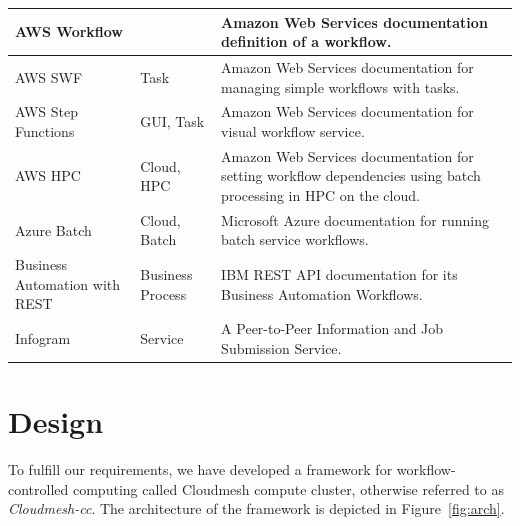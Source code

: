\documentclass[sigplan,screen]{acmart}
\newcommand{\FILE}[1]{}
\begin{document}
\begin{table}[htb]
{{\begin{tabular}{|p{3cm}|p{3cm}|p{10cm}|}
AWS Workflow \cite{www-aws-workflow} &  & Amazon Web Services documentation definition of a workflow.\\
\hline

AWS SWF \cite{www-aws-swf} & Task & Amazon Web Services documentation for managing simple workflows with tasks. \\
\hline

AWS Step Functions \cite{www-aws-stepfunctions} & GUI, Task & Amazon Web Services documentation for visual workflow service. \\
\hline

AWS HPC  \cite{www-aws-batch-workflow} & Cloud, HPC & Amazon Web Services documentation for setting workflow dependencies using batch processing in HPC on the cloud. \\
\hline

Azure Batch \cite{www-azure-batch} & Cloud, Batch & Microsoft Azure documentation for running batch service workflows. \\
  \hline

 Business Automation with REST \cite{www-business-rest-ibm} & Business
                                        Process& IBM REST API documentation for its Business Automation Workflows. \\
\hline

  


Infogram \cite{las-02-infogram} & Service & A Peer-to-Peer Information and Job Submission Service.\\
\hline
\end{tabular}
}
}
\end{table}

% 

\FILE{cc-design.tex}


\section{Design}

To fulfill our requirements, we have developed a framework for
workflow-controlled computing called Cloudmesh compute cluster,
otherwise referred to as {\em Cloudmesh-cc}. The architecture of the
framework is depicted in Figure~\ref{fig:arch}.
\end{document}
